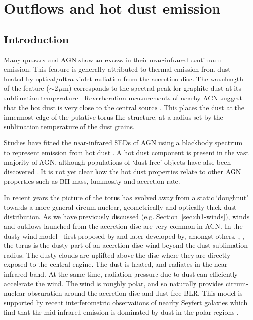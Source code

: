 
\chapter{Outflows and hot dust emission}
\label{ch:sed} 



\section{Introduction}

Many quasars and AGN show an excess in their near-infrared continuum emission. 
This feature is generally attributed to thermal emission from dust heated by optical/ultra-violet radiation from the accretion disc. 
The wavelength of the feature ($\sim2$\,$\mu$m) corresponds to the spectral peak for graphite dust at its sublimation temperature \citep[$T\sim1500$\,K;][]{barvainis87}. 
Reverberation measurements of nearby AGN suggest that the hot dust is very close to the central source \citep[few tens of light days; e.g.][]{minezaki04,suganuma06}.
This places the dust at the innermost edge of the putative torus-like structure, at a radius set by the sublimation temperature of the dust grains.  

Studies have fitted the near-infrared SEDs of AGN using a blackbody spectrum to represent emission from hot dust \citep[e.g.][]{edelson86,barvainis87,kishimoto07,mor09,riffel09,deo11,landt11,mor11,roseboom13}. 
A hot dust component is present in the vast majority of AGN, although populations of `dust-free' objects have also been discovered \citep{hao10,hao11,jiang10,mor11}. 
It is not yet clear how the hot dust properties relate to other AGN properties such as BH mass, luminosity and accretion rate. 

In recent years the picture of the torus has evolved away from a static `doughnut' towards a more general circum-nuclear, geometrically and optically thick dust distribution. 
As we have previously discussed (e.g. Section~\ref{sec:ch1-winds}), winds and outflows launched from the accretion disc are very common in AGN. 
In the dusty wind model - first proposed by \citet{konigl94} and later developed by, amongst others, \citet{everett05}, \citet{elitzur06}, \citet{keating12} - the torus is the dusty part of an accretion disc wind beyond the dust sublimation radius.  
The dusty clouds are uplifted above the disc where they are directly exposed to the central engine. 
The dust is heated, and radiates in the near-infrared band.
At the same time, radiation pressure due to dust can efficiently accelerate the wind. 
The wind is roughly polar, and so naturally provides circum-nuclear obscuration around the accretion disc and dust-free BLR.   
This model is supported by recent interferometric observations of nearby Seyfert galaxies which find that the mid-infrared emission is dominated by dust in the polar regions \citep[e.g.][]{raban09,honig12,honig13,tristram14,lopez-gonzaga16}.

